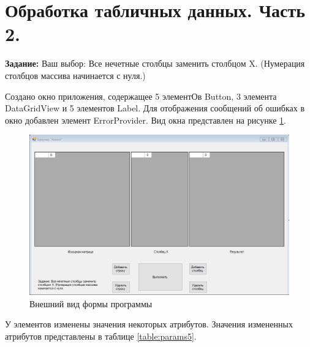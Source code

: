 \section{Обработка табличных данных. Часть 2.}

\textbf{Задание:} Ваш выбор: Все нечетные столбцы заменить столбцом X. 
(Нумерация столбцов массива начинается с нуля.)

Создано окно приложения, содержащее 5 элементОв Button, 3 элемента DataGridView и 5 элементов Label. 
Для отображения сообщений об ошибках в окно добавлен элемент ErrorProvider. Вид окна представлен на рисунке \ref{fig:task5_form}.

\begin{figure}[H]
    \centering
    \includegraphics{task5/form.png}
    \caption{Внешний вид формы программы}
    \label{fig:task5_form}
\end{figure}

У элементов изменены значения некоторых атрибутов. 
Значения измененных атрибутов представлены в таблице \ref{table:params5}.

